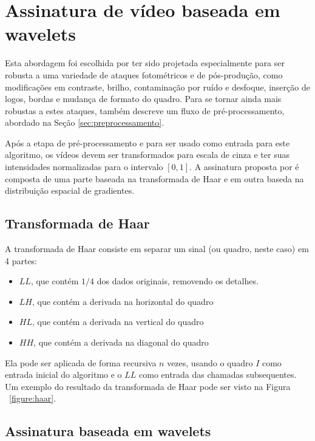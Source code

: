 \section{Assinatura de vídeo baseada em wavelets}

Esta abordagem foi escolhida por ter sido projetada especialmente para ser robusta a uma variedade de ataques fotométricos e de pós-produção, como modificações em contraste, brilho, contaminação por ruído e desfoque, inserção de logos, bordas e mudança de formato do quadro. Para se tornar ainda mais robustas a estes ataques, \cite{Dutta2013} também descreve um fluxo de pré-processamento, abordado na Seção \ref{sec:preprocessamento}.

Após a etapa de pré-processamento e para ser usado como entrada para este algoritmo, os vídeos devem ser transformados para escala de cinza e ter suas intensidades normalizadas para o intervalo $[0,1]$. A assinatura proposta por \cite{Dutta2013} é composta de uma parte baseada na transformada de Haar e em  outra baseda na distribuição espacial de gradientes.

\subsection{Transformada de Haar}

A transformada de Haar consiste em separar um sinal (ou quadro, neste caso) em 4 partes: 

\begin{itemize}
\item $LL$, que contém $1/4$ dos dados originais, removendo os detalhes.
\item $LH$, que contém a derivada na horizontal do quadro
\item $HL$, que contém a derivada na vertical do quadro
\item $HH$, que contém a derivada na diagonal do quadro
\end{itemize}

Ela pode ser aplicada de forma recursiva $n$ vezes, usando o quadro $I$ como entrada inicial do algoritmo e o $LL$ como entrada das chamadas subsequentes. Um exemplo do resultado da transformada de Haar pode ser visto na Figura ~\ref{figure:haar}.

\subsection{Assinatura baseada em wavelets}

